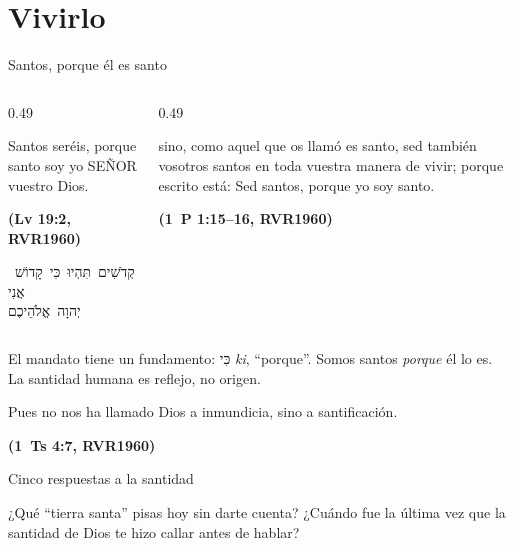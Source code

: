 \documentclass[hyperref={bookmarks=false},aspectratio=169]{beamer}
\newcommand{\heb}[1]{\mbox{\foreignlanguage{hebrew}{#1}}}
\newcommand{\SENOR}{S{\fontsize{0.78em}{1em}\selectfont EÑOR}}
\newcommand{\fuente}[1]{\par\hfill{\upshape\bfseries\footnotesize\textcolor{azul}{#1}}}
\begin{document}
\section{Vivirlo}

\begin{frame}{Santos, porque él es santo}
\begin{columns}[t,onlytextwidth]
\begin{column}{0.49\textwidth}
\begin{cita}Santos seréis, porque santo soy yo \SENOR{} vuestro Dios.\fuente{(Lv 19:2, RVR1960)}\end{cita}
\begin{center}\small\heb{קְדֹשִׁים תִּהְיוּ כִּי קָדוֹשׁ אֲנִי}\\ \heb{יְהוָה אֱלֹהֵיכֶם}\end{center}
\end{column}
\begin{column}{0.49\textwidth}
\begin{cita}sino, como aquel que os llamó es santo, sed también vosotros santos en toda vuestra manera de vivir; porque escrito está: Sed santos, porque yo soy santo.\fuente{(1~P 1:15--16, RVR1960)}\end{cita}
\end{column}
\end{columns}
\small El mandato tiene un fundamento: \heb{כִּי} \emph{ki}, ``porque''. Somos santos \emph{porque} él lo es. La santidad humana es reflejo, no origen.\par\smallskip
\begin{cita}Pues no nos ha llamado Dios a inmundicia, sino a santificación.\fuente{(1~Ts 4:7, RVR1960)}\end{cita}
\end{frame}

\begin{frame}{Cinco respuestas a la santidad}
\centering
{}\par\medskip
\small\RaggedRight ¿Qué ``tierra santa'' pisas hoy sin darte cuenta? ¿Cuándo fue la última vez que la santidad de Dios te hizo callar antes de hablar?
\end{frame}
\end{document}
